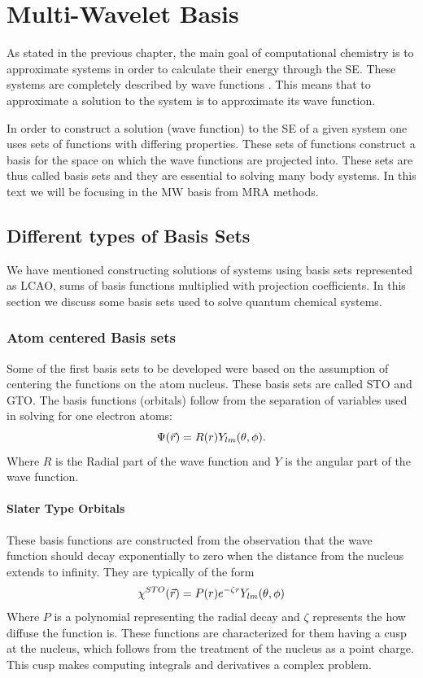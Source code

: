\documentclass[../master_thesis.tex]{subfiles}
\begin{document}
\chapter{Multi-Wavelet Basis}\label{chap:MW_basis}
As stated in the previous chapter, the main goal of computational chemistry is
to approximate systems in order to calculate their energy through the \ac{SE}. %
These systems are completely described by wave functions \cite{Cohen:1973}.
This means that to approximate a solution to the system is to approximate its
wave function.

In order to construct a solution (wave function) to the \ac{SE} of a given
system one uses sets of functions with differing properties. These
sets of functions construct a basis for the space on which the wave functions
are projected into. These sets are thus called basis sets \cite{Cramer:2004}
and they are essential to solving many body systems. In this text we will be
focusing in the \ac{MW} basis from \ac{MRA} methods.
\section{Different types of  Basis Sets}
We have mentioned constructing solutions of systems using basis sets represented as
\ac{LCAO}, sums of basis functions multiplied with projection coefficients.
In this section we discuss some basis sets used to solve quantum chemical systems.
\subsection{Atom centered Basis sets}
Some of the first basis sets to be developed were based on the assumption of
centering the functions on the atom nucleus. These basis sets are called \ac{STO}
and \ac{GTO}. The basis functions (orbitals) follow from the separation of variables
used in solving for one electron atoms:
\begin{equation}
  \Psi(\vec{r}) = R(r)Y_{lm}(\theta, \phi).
\end{equation}
Where $R$ is the Radial part of the wave function and $Y$ is the angular part of
the wave function.
\subsubsection{Slater Type Orbitals}
These basis functions are constructed from the observation that the wave function
should decay exponentially to zero when the distance from the nucleus extends
to infinity. They are typically of the form \cite{Jensen:2017, ESQCB1P1}
\begin{equation}
  \chi^{STO}(\vec{r}) = P(r)e^{-\zeta r}Y_{lm}(\theta, \phi)
\end{equation}
Where $P$ is a polynomial representing the radial decay and $\zeta$ represents the
how diffuse the function is. These functions are characterized for them having a cusp
at the nucleus, which follows from the treatment of the nucleus as a point charge.
This cusp makes computing integrals and derivatives a complex problem.
\end{document}
